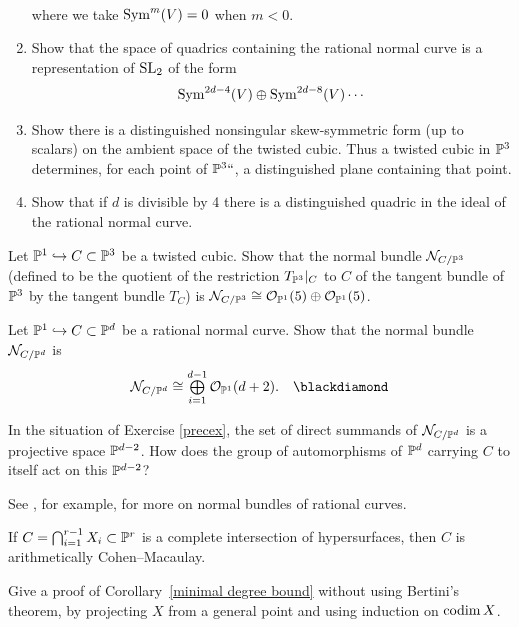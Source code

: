 \begin{exercise}
\begin{enumerate}
\begin{align*}
\end{align*}
where we take $\operatorname{Sym}^{m}(V)=0$ when $m<0$.
 \item Show that the space of quadrics containing the rational normal curve is a representation of $\operatorname{SL}_2$ of the form
 $$
 \operatorname{Sym}^{2d-4}(V)\oplus \operatorname{Sym}^{2d-8}(V) \cdots
 $$
  \item Show  there is a distinguished nonsingular
%
%
skew-symmetric form (up to scalars) on the ambient space of the twisted cubic.
Thus a twisted cubic in ${\mathbb P}^3$ determines, for each point of ${\mathbb P}^3` `$, a distinguished plane containing that point.
 \item Show that if $d$ is divisible by 4 there is a distinguished quadric in the ideal of the rational normal curve.
\end{enumerate}
\end{exercise}

\begin{exercise}\label{Normal bundle of cubic}
Let ${\mathbb P}^1 \hookrightarrow C \subset {\mathbb P}^3$ be a
twisted cubic.
%
Show that the normal bundle
%
${\mathcal N}_{C/{\mathbb P}^3}$ (defined to be the quotient of the restriction
$T_{{\mathbb P}^3}|_C$ to $C$ of the tangent bundle  of ${\mathbb P}^3$  by the
tangent bundle $T_C$) is
${\mathcal N}_{C/{\mathbb P}^3} \cong {\mathcal O}_{{\mathbb P}^1}(5) \oplus  {\mathcal O}_{{\mathbb P}^1}(5)$.
\end{exercise}

\begin{exercise}
Let ${\mathbb P}^1 \hookrightarrow C \subset {\mathbb P}^d$ be a rational normal
%
curve. Show that the
normal bundle
%
${\mathcal N}_{C/{\mathbb P}^d}$  is
\label{precex}
$$
\tsty
\cN_{C/\PP^d} \cong \bigoplus\limits_{i=1}^{d-1} \cO_{\PP^1}(d+2).
\tohint{3.14}
$$
\end{exercise}

\begin{exercise}
In the situation of
Exercise \ref{precex},
the set  of direct summands
of ${\mathcal N}_{C/{\mathbb P}^d} $ is a projective space ${\mathbb P}^{d-2}$. How does the
group of automorphisms of ${\mathbb P}^d$ carrying $C$ to itself act on this ${\mathbb P}^{d-2}$?
\end{exercise}

See \cite{MR3778979}, for example,
%
%
for more on normal bundles of rational curves.

\begin{exercise}\label{ci is acm}
If $C=\bigcap_{i = 1}^{r-1}X_i \subset {\mathbb P}^r$ is a
%
complete intersection
 of hypersurfaces,
then $C$ is
%
arithmetically Cohen--Macaulay.
\end{exercise}

\begin{exercise}
Give a proof of Corollary~\ref{minimal degree bound} without using
Bertini's theorem, by projecting $X$ from a general point and using
induction on $\operatorname{codim} X$.
\end{exercise}

